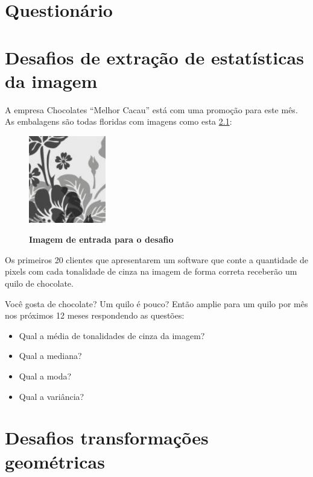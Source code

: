 \documentclass[
	12pt,				%
	oneside,			%
	a4paper,			%
	english,			%
	french,				%
	spanish,			%
	brazil,				%
	]{abntex2}
\begin{document}
\begin{apendicesenv}

\partapendices

\chapter{Questionário}
\label{apen:questionario}

\lipsum[55-57]

\chapter{Desafios de extração de estatísticas da imagem}
\label{desafio:estatistica}

A empresa Chocolates “Melhor Cacau” está com uma promoção para este mês. As embalagens são todas floridas com imagens como esta \ref{fig:desafioEstatistica}:

\begin{figure}[ht]
\centering
\caption{\textbf{Imagem de entrada para o desafio}}
\includegraphics[width=0.3\textwidth]{imagens/Desafio_estatisticas.png}
\label{fig:desafioEstatistica}
\sourceAuthor
\end{figure}

Os primeiros 20 clientes que apresentarem um software que conte a quantidade de pixels com cada tonalidade de cinza na imagem de forma correta receberão um quilo de chocolate.

Você gosta de chocolate? Um quilo é pouco? Então amplie para um quilo por mês nos próximos 12 meses respondendo as questões:

\begin{itemize}
  \item Qual a média de tonalidades de cinza da imagem?
  \item Qual a mediana?
  \item Qual a moda?
  \item Qual a variância?
\end{itemize}

\chapter{Desafios transformações geométricas}
\label{apen:transformacaoGeometrica}
\lipsum[55-57]

\end{apendicesenv}




\printindex
\end{document}
